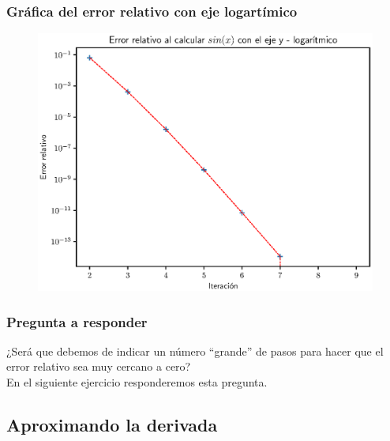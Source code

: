 \documentclass[12pt]{beamer}
\begin{document}
\begin{frame}
\frametitle{Gráfica del error relativo con eje logartímico}
\begin{figure}
    \centering
    \includegraphics[scale=0.6]{Imagenes/Plot_Serie_Seno_02.eps}
\end{figure}
\end{frame}
\begin{frame}
\frametitle{Pregunta a responder}
¿Será que debemos de indicar un número \enquote{grande} de pasos para hacer que el error relativo sea muy cercano a cero?
\\
\bigskip
\pause
En el siguiente ejercicio responderemos esta pregunta.
\end{frame}

\subsection{Aproximando la derivada}
\end{document}
